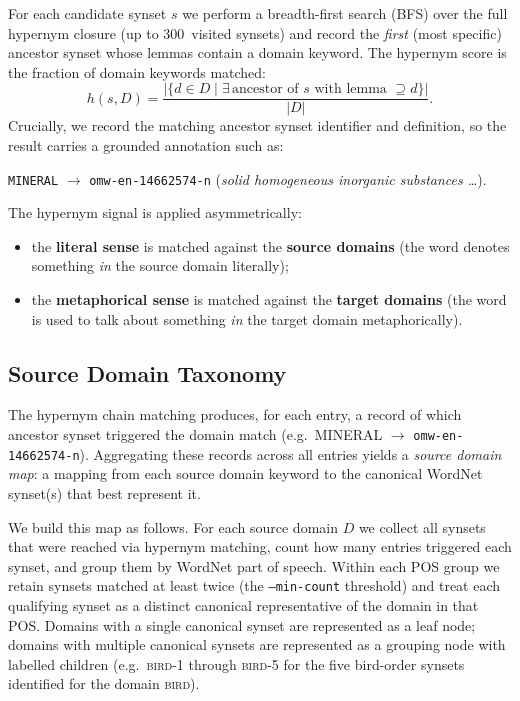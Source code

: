 \documentclass[11pt,a4paper]{article}
\begin{document}
For each candidate synset $s$ we perform a breadth-first search (BFS)
over the full hypernym closure (up to 300~visited synsets) and record the
\emph{first} (most specific) ancestor synset whose lemmas contain a
domain keyword.
The hypernym score is the fraction of domain keywords matched:
\begin{equation}
  h(s, D) = \frac{|\{d \in D \mid \exists\,\text{ancestor of }s
                   \text{ with lemma } \supseteq d\}|}{|D|}.
\end{equation}
Crucially, we record the matching ancestor synset identifier and definition,
so the result carries a grounded annotation such as:
\begin{center}
  \texttt{MINERAL} $\to$ \texttt{omw-en-14662574-n}
  (\emph{solid homogeneous inorganic substances \ldots}).
\end{center}
The hypernym signal is applied asymmetrically:
\begin{itemize}
  \item the \textbf{literal sense} is matched against the
        \textbf{source domains}
        (the word denotes something \emph{in} the source domain literally);
  \item the \textbf{metaphorical sense} is matched against the
        \textbf{target domains}
        (the word is used to talk about something \emph{in} the target domain
        metaphorically).
\end{itemize}

\subsection{Source Domain Taxonomy}
\label{subsec:domainmap}

The hypernym chain matching produces, for each entry, a record of which
ancestor synset triggered the domain match (e.g.\ MINERAL $\to$
\texttt{omw-en-14662574-n}).
Aggregating these records across all entries yields a \emph{source domain
map}: a mapping from each source domain keyword to the canonical WordNet
synset(s) that best represent it.

We build this map as follows.
For each source domain $D$ we collect all synsets that were reached via
hypernym matching, count how many entries triggered each synset, and group
them by WordNet part of speech.
Within each POS group we retain synsets matched at least twice (the
\texttt{--min-count} threshold) and treat each qualifying synset as a
distinct canonical representative of the domain in that POS.
Domains with a single canonical synset are represented as a leaf node;
domains with multiple canonical synsets are represented as a grouping node
with labelled children (e.g.\ \textsc{bird-1} through \textsc{bird-5}
for the five bird-order synsets identified for the domain \textsc{bird}).
\end{document}
